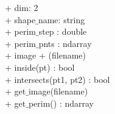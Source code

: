 {
+ dim: 2 \\
+ shape$\_$name: string \\
+ perim$\_$step : double \\
+ perim$\_$pnts : ndarray \\
+ image
}
{
+ \dunder(filename) \\
+ inside(pt) : bool \\
+ intersects(pt1, pt2) : bool \\
+ get$\_$image(filename) \\
+ get$\_$perim() : ndarray
}
